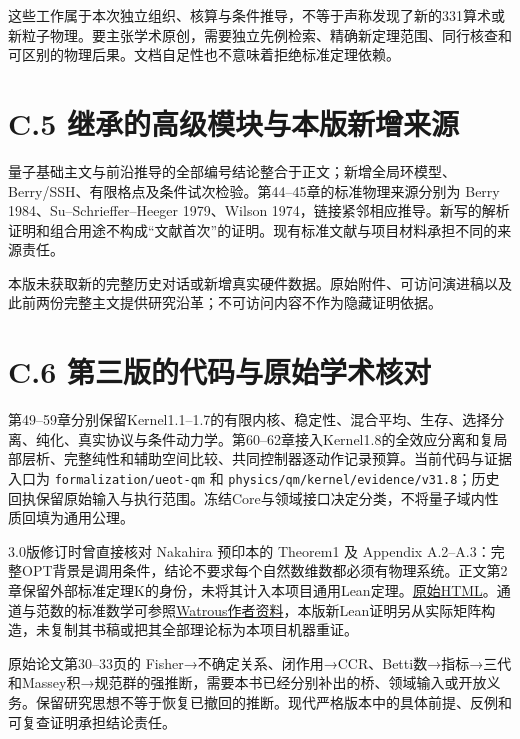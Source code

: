 \documentclass[
  11pt,
  oneside]{book}
\begin{document}
这些工作属于本次独立组织、核算与条件推导，不等于声称发现了新的331算术或新粒子物理。要主张学术原创，需要独立先例检索、精确新定理范围、同行核查和可区别的物理后果。文档自足性也不意味着拒绝标准定理依赖。

\hypertarget{c.5-ux7ee7ux627fux7684ux9ad8ux7ea7ux6a21ux5757ux4e0eux672cux7248ux65b0ux589eux6765ux6e90}{%
\section{C.5
继承的高级模块与本版新增来源}\label{c.5-ux7ee7ux627fux7684ux9ad8ux7ea7ux6a21ux5757ux4e0eux672cux7248ux65b0ux589eux6765ux6e90}}

量子基础主文与前沿推导的全部编号结论整合于正文；新增全局环模型、Berry/SSH、有限格点及条件试次检验。第44--45章的标准物理来源分别为
Berry 1984、Su--Schrieffer--Heeger 1979、Wilson
1974，链接紧邻相应推导。新写的解析证明和组合用途不构成``文献首次''的证明。现有标准文献与项目材料承担不同的来源责任。

本版未获取新的完整历史对话或新增真实硬件数据。原始附件、可访问演进稿以及此前两份完整主文提供研究沿革；不可访问内容不作为隐藏证明依据。

\hypertarget{c.6-ux7b2cux4e09ux7248ux7684ux4ee3ux7801ux4e0eux539fux59cbux5b66ux672fux6838ux5bf9}{%
\section{C.6
第三版的代码与原始学术核对}\label{c.6-ux7b2cux4e09ux7248ux7684ux4ee3ux7801ux4e0eux539fux59cbux5b66ux672fux6838ux5bf9}}

第49--59章分别保留Kernel1.1--1.7的有限内核、稳定性、混合平均、生存、选择分离、纯化、真实协议与条件动力学。第60--62章接入Kernel1.8的全效应分离和复局部层析、完整纯性和辅助空间比较、共同控制器逐动作记录预算。当前代码与证据入口为
\texttt{formalization/ueot-qm} 和
\texttt{physics/qm/kernel/evidence/v31.8}；历史回执保留原始输入与执行范围。冻结Core与领域接口决定分类，不将量子域内性质回填为通用公理。

3.0版修订时曾直接核对 Nakahira 预印本的 Theorem1 及 Appendix
A.2--A.3：完整OPT背景是调用条件，结论不要求每个自然数维数都必须有物理系统。正文第2章保留外部标准定理K的身份，未将其计入本项目通用Lean定理。\href{https://arxiv.org/html/2605.23217v1}{原始HTML}。通道与范数的标准数学可参照\href{https://cs.uwaterloo.ca/~watrous/TQI/}{Watrous作者资料}，本版新Lean证明另从实际矩阵构造，未复制其书稿或把其全部理论标为本项目机器重证。

原始论文第30--33页的
Fisher→不确定关系、闭作用→CCR、Betti数→指标→三代和Massey积→规范群的强推断，需要本书已经分别补出的桥、领域输入或开放义务。保留研究思想不等于恢复已撤回的推断。现代严格版本中的具体前提、反例和可复查证明承担结论责任。
\end{document}
